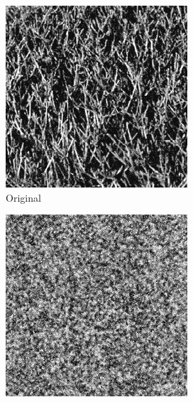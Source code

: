 \documentclass[11pt, oneside]{article}   	%
\begin{document}
\begin{figure}[H]
    \centering
    \begin{subfigure}[b]{0.3\textwidth}
        \includegraphics[width=\textwidth]{grass0}
        \caption{Original}
        \label{fig:grass0}
    \end{subfigure}
    \begin{subfigure}[b]{0.3\textwidth}
        \includegraphics[width=\textwidth]{grass1}

\end{subfigure}
\end{figure}
\end{document}
